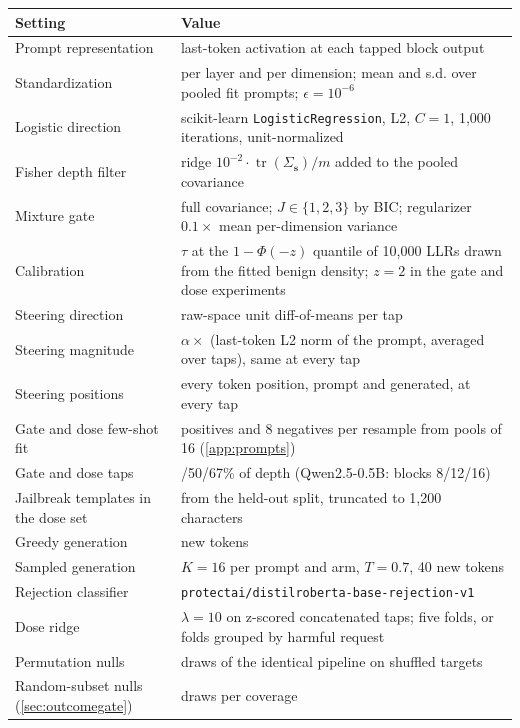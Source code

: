 \documentclass[11pt]{article}
\begin{document}
\begin{small}
\begin{tabularx}{\textwidth}{>{\raggedright\arraybackslash}p{4.6cm}>{\raggedright\arraybackslash}X}
\toprule
Setting & Value \\
\midrule
Prompt representation & last-token activation at each tapped block output \\
Standardization & per layer and per dimension; mean and s.d. over pooled fit prompts; $\epsilon=10^{-6}$ \\
Logistic direction & scikit-learn \texttt{LogisticRegression}, L2, $C=1$, 1{,}000 iterations, unit-normalized \\
Fisher depth filter & ridge $10^{-2}\cdot\operatorname{tr}(\Sigma_{\mathbf{s}})/m$ added to the pooled covariance \\
Mixture gate & full covariance; $J\in\{1,2,3\}$ by BIC; regularizer $0.1\times$ mean per-dimension variance \\
Calibration & $\tau$ at the $1-\Phi(-z)$ quantile of 10{,}000 LLRs drawn from the fitted benign density;
  $z=2$ in the gate and dose experiments \\
Steering direction & raw-space unit diff-of-means per tap \\
Steering magnitude & $\alpha\times$ (last-token L2 norm of the prompt, averaged over taps), same at every tap \\
Steering positions & every token position, prompt and generated, at every tap \\
Gate and dose few-shot fit & 8 positives and 8 negatives per resample from pools of 16 (\cref{app:prompts}) \\
Gate and dose taps & 33/50/67\% of depth (Qwen2.5-0.5B: blocks 8/12/16) \\
Jailbreak templates in the dose set & 120 from the held-out split, truncated to 1{,}200 characters \\
Greedy generation & 40 new tokens \\
Sampled generation & $K=16$ per prompt and arm, $T=0.7$, 40 new tokens \\
Rejection classifier & \texttt{protectai/distilroberta-base-rejection-v1}~\citep{protectai2024rejection} \\
Dose ridge & $\lambda=10$ on z-scored concatenated taps; five folds, or folds grouped by harmful request \\
Permutation nulls & 300 draws of the identical pipeline on shuffled targets \\
Random-subset nulls (\cref{sec:outcomegate}) & 500 draws per coverage \\
\bottomrule
\end{tabularx}
\end{small}
\end{document}
